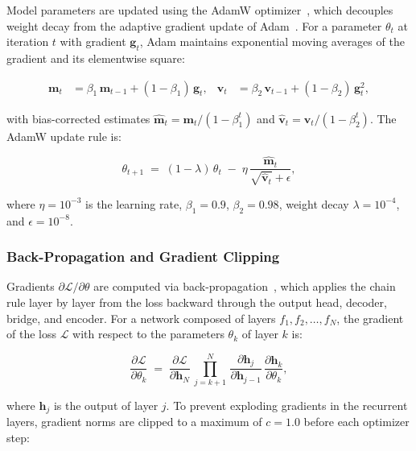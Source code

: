 \documentclass[12pt,a4paper]{report}
\begin{document}
Model parameters are updated using the AdamW optimizer~\cite{loshchilov2019}, which decouples weight decay from the adaptive gradient update of Adam~\cite{kingma2015}.  For a parameter $\theta_t$ at iteration $t$ with gradient $\mathbf{g}_t$, Adam maintains exponential moving averages of the gradient and its elementwise square:

\begin{align}
  \mathbf{m}_t &= \beta_1\,\mathbf{m}_{t-1} + (1-\beta_1)\,\mathbf{g}_t, &
  \mathbf{v}_t &= \beta_2\,\mathbf{v}_{t-1} + (1-\beta_2)\,\mathbf{g}_t^2,
  \label{eq:adam_moments}
\end{align}

with bias-corrected estimates $\hat{\mathbf{m}}_t = \mathbf{m}_t / (1-\beta_1^t)$ and $\hat{\mathbf{v}}_t = \mathbf{v}_t / (1-\beta_2^t)$.  The AdamW update rule is:

\begin{equation}
  \theta_{t+1} \;=\; (1 - \lambda)\,\theta_t \;-\; \eta\,
  \frac{\hat{\mathbf{m}}_t}{\sqrt{\hat{\mathbf{v}}_t} + \epsilon},
  \label{eq:adamw_update}
\end{equation}

where $\eta = 10^{-3}$ is the learning rate, $\beta_1 = 0.9$, $\beta_2 = 0.98$, weight decay $\lambda = 10^{-4}$, and $\epsilon = 10^{-8}$.

\subsubsection{Back-Propagation and Gradient Clipping}

Gradients $\partial\mathcal{L}/\partial\theta$ are computed via back-propagation~\cite{rumelhart1986}, which applies the chain rule layer by layer from the loss backward through the output head, decoder, bridge, and encoder.  For a network composed of layers $f_1, f_2, \ldots, f_N$, the gradient of the loss $\mathcal{L}$ with respect to the parameters $\theta_k$ of layer $k$ is:

\begin{equation}
  \frac{\partial \mathcal{L}}{\partial \theta_k}
  \;=\; \frac{\partial \mathcal{L}}{\partial \mathbf{h}_N}
  \,\prod_{j=k+1}^{N}\,
  \frac{\partial \mathbf{h}_j}{\partial \mathbf{h}_{j-1}}
  \,\frac{\partial \mathbf{h}_k}{\partial \theta_k},
  \label{eq:backprop}
\end{equation}

\noindent where $\mathbf{h}_j$ is the output of layer $j$.  To prevent exploding gradients in the recurrent layers, gradient norms are clipped to a maximum of $c = 1.0$ before each optimizer step:
\end{document}
